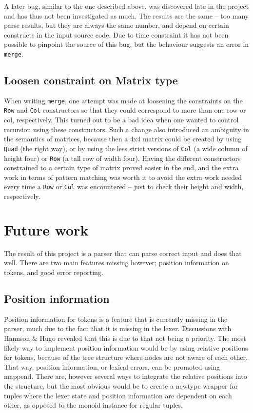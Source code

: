 \documentclass[a4paper,12pt,twosided]{report}
\begin{document}
A later bug, similar to the one described above, was discovered late in the
project and has thus not been investigated as much. The results are the same --
too many parse results, but they are always the same number, and depend on
certain constructs in the input source code. Due to time constraint it has not
been possible to pinpoint the source of this bug, but the behaviour suggests an
error in \texttt{merge}. \label{branchbug}

\subsection{Loosen constraint on Matrix type}
When writing \texttt{merge}, one attempt was made at loosening the constraints
on the \texttt{Row} and \texttt{Col} constructors so that they could correspond
to more than one row or col, respectively. This turned out to be a bad idea when
one wanted to control recursion using these constructors. Such a change also
introduced an ambiguity in the semantics of matrices, because then a 4x4 matrix
could be created by using \texttt{Quad} (the right way), or by using the less
strict versions of \texttt{Col} (a wide column of height four) or \texttt{Row}
(a tall row of width four). Having the different constructors constrained to a
certain type of matrix proved easier in the end, and the extra work in terms of
pattern matching was worth it to avoid the extra work needed every time a
\texttt{Row} or \texttt{Col} was encountered -- just to check their height and
width, respectively.  

\section{Future work}
The result of this project is a parser that can parse correct input and does
that well. There are two main features missing however; position information on
tokens, and good error reporting.

\subsection{Position information}
Position information for tokens is a feature that is currently missing in the
parser, much due to the fact that it is missing in the lexer. Discussions with
Hannson \& Hugo revealed that this is due to that not being a priority. The
most likely way to implement position information would be by using relative
positions for tokens, because of the tree structure where nodes are not aware of
each other. That way, position information, or lexical errors, can be promoted
using mappend. There are, however several ways to integrate the relative
positions into the structure, but the most obvious would be to create a newtype
wrapper for tuples where the lexer state and position information are dependent
on each other, as opposed to the monoid instance for regular tuples. 
\end{document}
